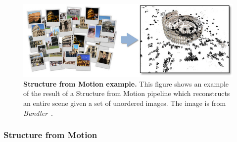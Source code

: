 
\begin{figure}
	\centering
    \includegraphics[width=\textwidth]{main/introduction/images/bundler_example.jpg}
    \caption[Structure from Motion example]{\textbf{Structure from Motion example.} This figure shows an example of the result of a Structure from Motion pipeline which reconstructs an entire scene given a set of unordered images. The image is from \textit{Bundler}~\cite{snavely2006}.}
	\label{fig:sfm_example}
\end{figure}

\subsubsection{Structure from Motion}

